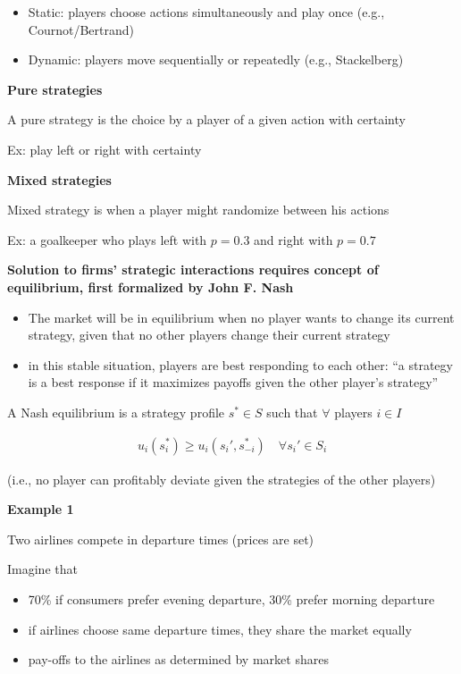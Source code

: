 \documentclass[10pt]{article}
\begin{document}
\begin{itemize}
    \item Static: players choose actions simultaneously and play once (e.g., Cournot/Bertrand)
    \item Dynamic: players move sequentially or repeatedly (e.g., Stackelberg)
\end{itemize}

\hfill 

\textbf{Pure strategies}

A pure strategy is the choice by a player of a given action with certainty

Ex: play left or right with certainty

\hfill 

\textbf{Mixed strategies}

Mixed strategy is when a player might randomize between his actions 

Ex: a goalkeeper who plays left with $p = 0.3$ and right with $p = 0.7$

\hfill 

\textbf{Solution to firms' strategic interactions requires concept of equilibrium, first formalized by John F. Nash}
\begin{itemize}
    \item The market will be in equilibrium when no player wants to change its current strategy, given that no other players change their current strategy
    \item in this stable situation, players are best responding to each other: ``a strategy is a best response if it maximizes payoffs given the other player's strategy''
\end{itemize}

\hfill

A Nash equilibrium is a strategy profile $s^* \in S$ such that $\forall$ players $i \in I$

\begin{align*}
    u_i(s_i^*) \geq u_i(s_i', s_{-i}^*) \quad \forall s_i' \in S_i
\end{align*}

(i.e., no player can profitably deviate given the strategies of the other players)

\hfill 

\textbf{Example 1}

Two airlines compete in departure times (prices are set)

Imagine that 
\begin{itemize}
    \item 70\% if consumers prefer evening departure, 30\% prefer morning departure
    \item if airlines choose same departure times, they share the market equally
    \item pay-offs to the airlines as determined by market shares
\end{itemize}
\end{document}
